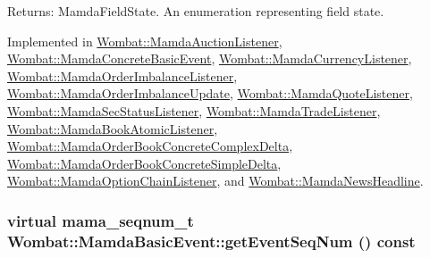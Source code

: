 \begin{Desc}
\item[Returns:]Mamda\-Field\-State. An enumeration representing field state. \end{Desc}


Implemented in \hyperlink{classWombat_1_1MamdaAuctionListener_9c0f690606ab4ec265fc97235e90c93d}{Wombat::Mamda\-Auction\-Listener}, \hyperlink{classWombat_1_1MamdaConcreteBasicEvent_8e848f2a327a657f8879ae6a53ee896d}{Wombat::Mamda\-Concrete\-Basic\-Event}, \hyperlink{classWombat_1_1MamdaCurrencyListener_78906357e4729fb45bf3e80b4d625689}{Wombat::Mamda\-Currency\-Listener}, \hyperlink{classWombat_1_1MamdaOrderImbalanceListener_d8f5442d6f66c8a21c32581c66033146}{Wombat::Mamda\-Order\-Imbalance\-Listener}, \hyperlink{classWombat_1_1MamdaOrderImbalanceUpdate_20f8acc3d8d9fca3cf6db1ca24ef1980}{Wombat::Mamda\-Order\-Imbalance\-Update}, \hyperlink{classWombat_1_1MamdaQuoteListener_f9ff48ba9ea68b551b07e18ebef77a51}{Wombat::Mamda\-Quote\-Listener}, \hyperlink{classWombat_1_1MamdaSecStatusListener_1915e75d55253a45e543bffe36393803}{Wombat::Mamda\-Sec\-Status\-Listener}, \hyperlink{classWombat_1_1MamdaTradeListener_0ebdcf5fd43af5725690bf4ed5bdf0d1}{Wombat::Mamda\-Trade\-Listener}, \hyperlink{classWombat_1_1MamdaBookAtomicListener_43081dcece02d10a8291cd9326c550f3}{Wombat::Mamda\-Book\-Atomic\-Listener}, \hyperlink{classWombat_1_1MamdaOrderBookConcreteComplexDelta_42ee7ffbc3efc20b27e6d2c8bd608be3}{Wombat::Mamda\-Order\-Book\-Concrete\-Complex\-Delta}, \hyperlink{classWombat_1_1MamdaOrderBookConcreteSimpleDelta_4a217a14e0da5dba63b9cea51b53f513}{Wombat::Mamda\-Order\-Book\-Concrete\-Simple\-Delta}, \hyperlink{classWombat_1_1MamdaOptionChainListener_8766c380f388bac26dc3ba51312b8e09}{Wombat::Mamda\-Option\-Chain\-Listener}, and \hyperlink{classWombat_1_1MamdaNewsHeadline_10f8732e6a2cdcd78b4aa2d538a0d8e0}{Wombat::Mamda\-News\-Headline}.\hypertarget{classWombat_1_1MamdaBasicEvent_1fd845d48e95b4ee3beafc72d1ac2adf}{
\subsubsection[getEventSeqNum]{\setlength{\rightskip}{0pt plus 5cm}virtual mama\_\-seqnum\_\-t Wombat::Mamda\-Basic\-Event::get\-Event\-Seq\-Num () const}}
\label{classWombat_1_1MamdaBasicEvent_1fd845d48e95b4ee3beafc72d1ac2adf}


